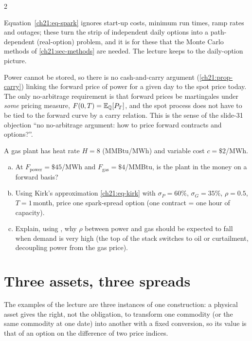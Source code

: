 \begin{paracol}{2}
\begin{remark}
Equation~\eqref{ch21:eq-spark} ignores start-up costs, minimum run times, ramp rates and outages; these turn the strip of independent daily options into a path-dependent (real-option) problem, and it is for these that the Monte Carlo methods of
\cref{ch21:sec-methods} are needed. The lecture keeps to the daily-option picture.
\end{remark}

\begin{intuition}
Power cannot be stored, so there is no cash-and-carry argument (\cref{ch21:prop-carry}) linking the forward price of power for a given day to the spot price today. The only no-arbitrage requirement is that forward prices be martingales under \emph{some} pricing measure,
$F(0,T)=\mathbb{E}_{\mathbb{Q}}[P_T]$, and the spot process does not have to be tied to the forward curve by a carry relation. This is the sense of the slide-31 objection ``no no-arbitrage argument: how to price forward contracts and options?''.
\end{intuition}

\begin{exercise}\label{ch21:ex-heatrate}
A gas plant has heat rate $H=8$ (MMBtu/MWh) and variable cost $c=\$2$/MWh.
\begin{enumerate}[(a)]
  \item At $F_{\mathrm{power}}=\$45$/MWh and $F_{\mathrm{gas}}=\$4$/MMBtu, is the plant in the
      money on a forward basis?
  \item Using Kirk's approximation \eqref{ch21:eq-kirk} with $\sigma_P=60\%$, $\sigma_G=35\%$, $\rho=0.5$, $T=1$\,month, price one spark-spread option
      (one contract = one hour of capacity).
  \item Explain, using , why $\rho$ between power and gas should be expected to fall when demand is very high (the
      top of the stack switches to oil or curtailment, decoupling power from the gas price).
\end{enumerate}
\end{exercise}

\section{Three assets, three spreads}\label{ch21:sec-assets}
The examples of the lecture are three instances of one construction: a physical asset gives the right, not the obligation, to transform one commodity (or the same commodity at one date) into another with a fixed conversion, so its value is that of an option on the difference of two price indices.


\end{paracol}
